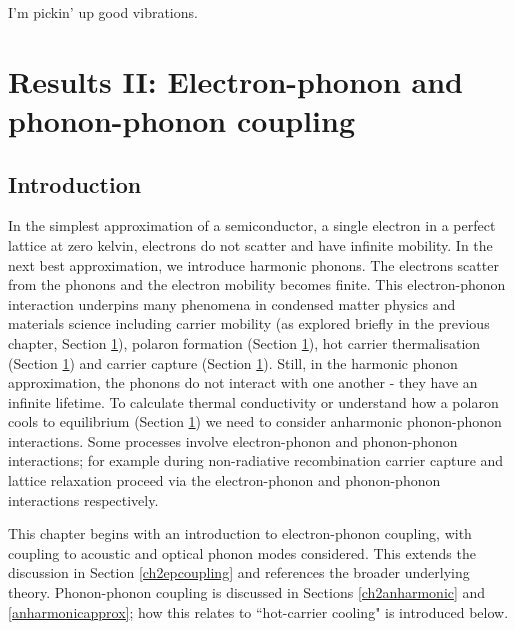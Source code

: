 \begin{savequote}[8cm]
I'm pickin' up good vibrations.
\end{savequote}

\chapter{\label{ch:5-epcoupling}Results II: Electron-phonon and phonon-phonon coupling}
\section{Introduction} \label{ch5:introduction}

In the simplest approximation of a semiconductor, a single electron in a perfect lattice at zero kelvin, electrons do not scatter and have infinite mobility. In the next best approximation, we introduce harmonic phonons. The electrons scatter from the phonons and the electron mobility becomes finite. This electron-phonon interaction underpins many phenomena in condensed matter physics and materials science including carrier mobility (as explored briefly in the previous chapter, Section \ref{}), polaron formation (Section \ref{}), hot carrier thermalisation (Section \ref{}) and carrier capture (Section \ref{}). Still, in the harmonic phonon approximation, the phonons do not interact with one another - they have an infinite lifetime. To calculate thermal conductivity or understand how a polaron cools to equilibrium (Section \ref{}) we need to consider anharmonic phonon-phonon interactions. Some processes involve electron-phonon and phonon-phonon interactions; for example during non-radiative recombination carrier capture and lattice relaxation proceed via the electron-phonon and phonon-phonon interactions respectively. 

This chapter begins with an introduction to electron-phonon coupling, with coupling to acoustic and optical phonon modes considered. This extends the discussion in Section \ref{ch2epcoupling} and references the broader underlying theory. Phonon-phonon coupling is discussed in Sections \ref{ch2anharmonic} and \ref{anharmonicapprox}; how this relates to ``hot-carrier cooling" is introduced below.

